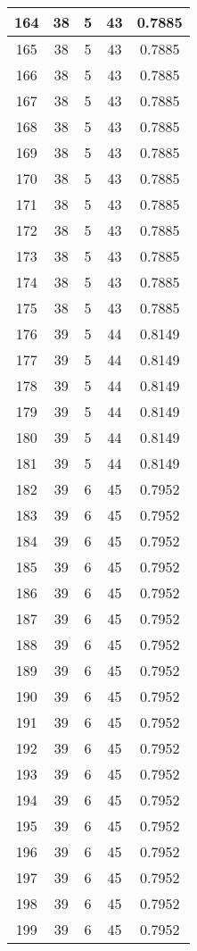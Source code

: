 \documentclass[letterpaper, 12pt]{article}
\begin{document}
\begin{longtable}{|c|c|c|c|c|}
\hline
164 & 38 & 5 & 43 & 0.7885 \\
\hline
165 & 38 & 5 & 43 & 0.7885 \\
\hline
166 & 38 & 5 & 43 & 0.7885 \\
\hline
167 & 38 & 5 & 43 & 0.7885 \\
\hline
168 & 38 & 5 & 43 & 0.7885 \\
\hline
169 & 38 & 5 & 43 & 0.7885 \\
\hline
170 & 38 & 5 & 43 & 0.7885 \\
\hline
171 & 38 & 5 & 43 & 0.7885 \\
\hline
172 & 38 & 5 & 43 & 0.7885 \\
\hline
173 & 38 & 5 & 43 & 0.7885 \\
\hline
174 & 38 & 5 & 43 & 0.7885 \\
\hline
175 & 38 & 5 & 43 & 0.7885 \\
\hline
176 & 39 & 5 & 44 & 0.8149 \\
\hline
177 & 39 & 5 & 44 & 0.8149 \\
\hline
178 & 39 & 5 & 44 & 0.8149 \\
\hline
179 & 39 & 5 & 44 & 0.8149 \\
\hline
180 & 39 & 5 & 44 & 0.8149 \\
\hline
181 & 39 & 5 & 44 & 0.8149 \\
\hline
182 & 39 & 6 & 45 & 0.7952 \\
\hline
183 & 39 & 6 & 45 & 0.7952 \\
\hline
184 & 39 & 6 & 45 & 0.7952 \\
\hline
185 & 39 & 6 & 45 & 0.7952 \\
\hline
186 & 39 & 6 & 45 & 0.7952 \\
\hline
187 & 39 & 6 & 45 & 0.7952 \\
\hline
188 & 39 & 6 & 45 & 0.7952 \\
\hline
189 & 39 & 6 & 45 & 0.7952 \\
\hline
190 & 39 & 6 & 45 & 0.7952 \\
\hline
191 & 39 & 6 & 45 & 0.7952 \\
\hline
192 & 39 & 6 & 45 & 0.7952 \\
\hline
193 & 39 & 6 & 45 & 0.7952 \\
\hline
194 & 39 & 6 & 45 & 0.7952 \\
\hline
195 & 39 & 6 & 45 & 0.7952 \\
\hline
196 & 39 & 6 & 45 & 0.7952 \\
\hline
197 & 39 & 6 & 45 & 0.7952 \\
\hline
198 & 39 & 6 & 45 & 0.7952 \\
\hline
199 & 39 & 6 & 45 & 0.7952 \\
\hline
\end{longtable}
\end{document}
